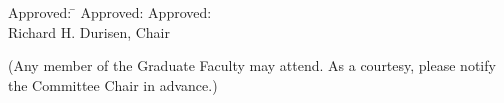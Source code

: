 \documentclass[letterpaper,11pt]{article}
\begin{document}
\begin{spacing}{1.0}
\vspace{0.3cm}

\begin{tabbing}
Approved:\=\underline{\hspace{6.0cm}} \= \hspace{0.1\linewidth}
Approved:\underline{\hspace{6.0cm}} \kill
Approved:\>\underline{\hspace{6.0cm}} \> \hspace{0.1\linewidth}
 \\
\>Richard H. Durisen, Chair \> \hspace{0.2\linewidth}
\end{tabbing}

\vspace{0.3cm}

\noindent
(Any member of the Graduate Faculty may attend.  As a courtesy, please notify
the Committee Chair in advance.)
\end{spacing}
\end{document}
